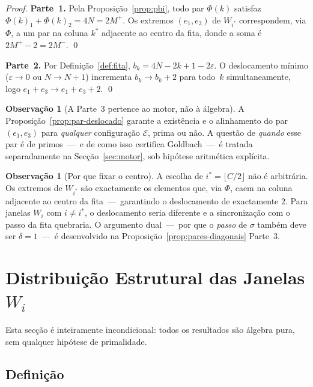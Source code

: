 \documentclass[12pt, a4paper]{article}
\theoremstyle{plain}
\theoremstyle{definition}
\newtheorem{remark}[theorem]{Observação}
\theoremstyle{remark}
\begin{document}
	\begin{proof}
		\textbf{Parte~1.}  Pela Proposição~\ref{prop:phi}, todo par
		$\Phi(k)$ satisfaz $\Phi(k)_1+\Phi(k)_2=4N=2M^+$.  Os extremos
		$(e_1,e_3)$ de $W_{i^*}$ correspondem, via $\Phi$, a um par na
		coluna $k^*$ adjacente ao centro da fita, donde a soma é
		$2M^+-2=2M^-$. \qed
		
		\textbf{Parte~2.}  Por Definição~\ref{def:fita},
		$b_k=4N-2k+1-2\varepsilon$.  O deslocamento mínimo
		($\varepsilon\to0$ ou $N\to N+1$) incrementa $b_k\to b_k+2$ para
		todo~$k$ simultaneamente, logo $e_1+e_3\to e_1+e_3+2$. \qed
	\end{proof}
	
	\begin{remark}[A Parte~3 pertence ao motor, não à álgebra]
		A Proposição~\ref{prop:par-deslocado} garante a existência e o
		alinhamento do par $(e_1,e_3)$ para \emph{qualquer} configuração
		$\mathcal{E}$, prima ou não.  A questão de \emph{quando} esse par
		é de primos~---~e de como isso certifica Goldbach~---~é tratada
		separadamente na Secção~\ref{sec:motor}, sob hipótese aritmética
		explícita.
	\end{remark}
	
	\begin{remark}[Por que fixar o centro]
		A escolha de $i^*=\lfloor C/2\rfloor$ não é arbitrária.  Os
		extremos de $W_{i^*}$ são exactamente os elementos que, via
		$\Phi$, caem na coluna adjacente ao centro da fita~---~garantindo
		o deslocamento de exactamente $2$.  Para janelas $W_i$ com
		$i\neq i^*$, o deslocamento seria diferente e a sincronização com
		o passo da fita quebraria.  O argumento dual~---~por que o
		\emph{passo} de $\sigma$ também deve ser $\delta=1$~---~é
		desenvolvido na Proposição~\ref{prop:pares-diagonais} Parte~3.
	\end{remark}
	
	\section{Distribuição Estrutural das Janelas $W_i$}
	\label{sec:sigma}
	
	Esta secção é inteiramente incondicional: todos os resultados são
	álgebra pura, sem qualquer hipótese de primalidade.
	
	\subsection{Definição}
	
\end{document}
